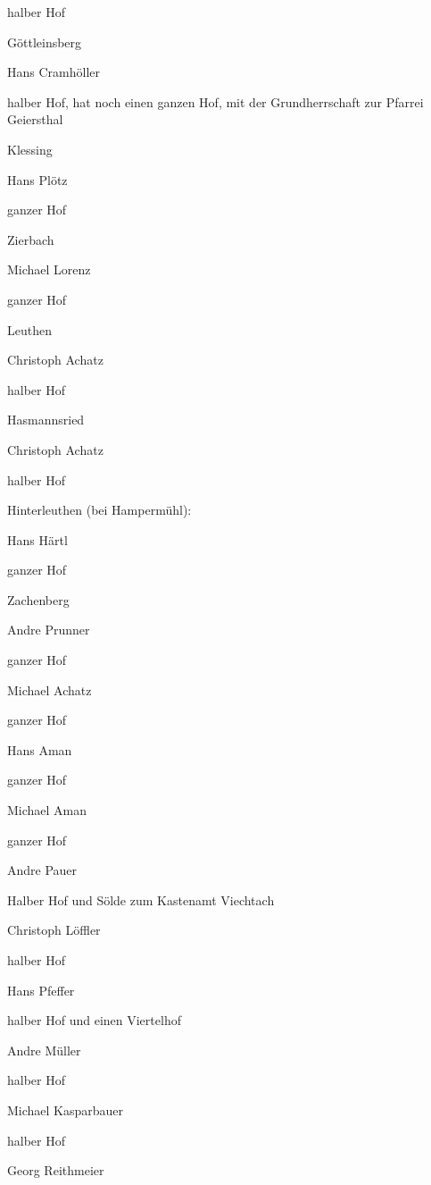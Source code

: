 \documentclass[12pt,a4pager]{book}
\begin{document}
halber Hof

Göttleinsberg

Hans Cramhöller

halber Hof, hat noch einen ganzen Hof, mit der Grundherrschaft zur Pfarrei
Geiersthal

Klessing

Hans Plötz

ganzer Hof

Zierbach

Michael Lorenz

ganzer Hof

Leuthen

Christoph Achatz

halber Hof

Hasmannsried

Christoph Achatz

halber Hof

Hinterleuthen (bei Hampermühl):

Hans Härtl

ganzer Hof

Zachenberg

Andre Prunner

ganzer Hof



Michael Achatz

ganzer Hof



Hans Aman

ganzer Hof



Michael Aman

ganzer Hof



Andre Pauer

Halber Hof und Sölde zum Kastenamt Viechtach



Christoph Löffler

halber Hof



Hans Pfeffer

halber Hof und einen Viertelhof



Andre Müller

halber Hof



Michael Kasparbauer

halber Hof



Georg Reithmeier
\end{document}
